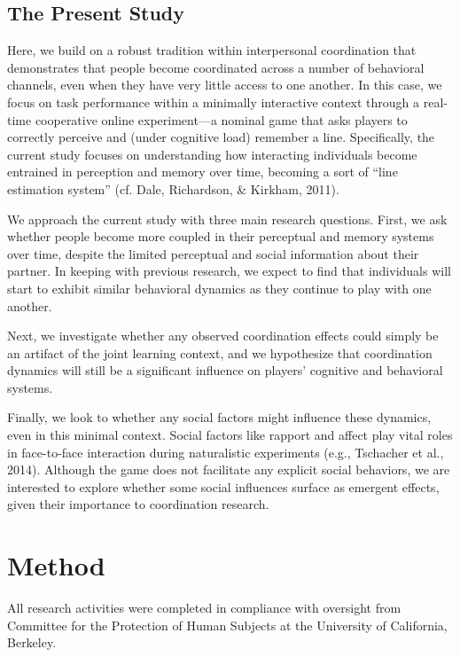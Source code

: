 \documentclass[10pt, letterpaper]{article}
\begin{document}
\subsection{The Present Study}\label{the-present-study}

Here, we build on a robust tradition within interpersonal coordination
that demonstrates that people become coordinated across a number of
behavioral channels, even when they have very little access to one
another. In this case, we focus on task performance within a minimally
interactive context through a real-time cooperative online
experiment---a nominal game that asks players to correctly perceive and
(under cognitive load) remember a line. Specifically, the current study
focuses on understanding how interacting individuals become entrained in
perception and memory over time, becoming a sort of ``line estimation
system'' (cf. Dale, Richardson, \& Kirkham, 2011).

We approach the current study with three main research questions. First,
we ask whether people become more coupled in their perceptual and memory
systems over time, despite the limited perceptual and social information
about their partner. In keeping with previous research, we expect to
find that individuals will start to exhibit similar behavioral dynamics
as they continue to play with one another.

Next, we investigate whether any observed coordination effects could
simply be an artifact of the joint learning context, and we hypothesize
that coordination dynamics will still be a significant influence on
players' cognitive and behavioral systems.

Finally, we look to whether any social factors might influence these
dynamics, even in this minimal context. Social factors like rapport and
affect play vital roles in face-to-face interaction during naturalistic
experiments (e.g., Tschacher et al., 2014). Although the game does not
facilitate any explicit social behaviors, we are interested to explore
whether some social influences surface as emergent effects, given their
importance to coordination research.

\section{Method}\label{method}

All research activities were completed in compliance with oversight from
Committee for the Protection of Human Subjects at the University of
California, Berkeley.
\end{document}
